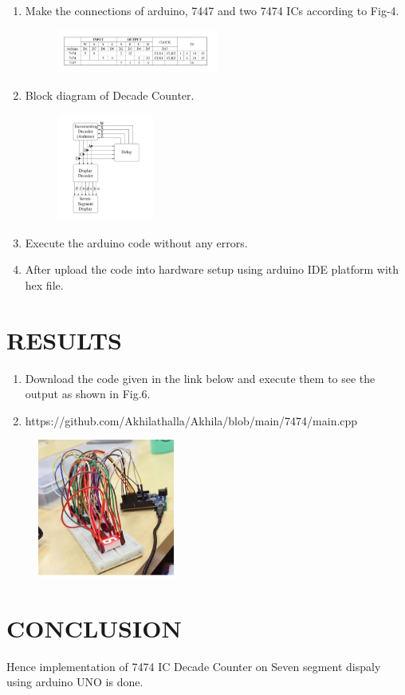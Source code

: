 \documentclass[conference]{IEEEtran}
\begin{document}
\begin{enumerate}

\item Make the connections of arduino, 7447 and two 7474 ICs according to Fig-4.
 \begin{figure}[h] 
 \centering 
 \includegraphics[width=0.5\textwidth]{5.jpg}
 \caption{\label{fig-4:Gates}}    
\end{figure}

\item Block diagram of Decade Counter.

\begin{figure}[h]                           
\centering                                 
\includegraphics[width=0.3\textwidth]{6.jpg}                                           
\caption{\label{fig-5:Gates}}               
\end{figure}


 
\item Execute the arduino code without any errors.
\item After upload the code into hardware setup using arduino IDE platform with hex file.
 \end{enumerate}

\section{RESULTS}
 \begin{enumerate}
  \item Download the code given in the link below and execute them to see the output as shown in Fig.6. 
  \item https://github.com/Akhilathalla/Akhila/blob/main/7474/main.cpp
 \end{enumerate}
   \begin{figure}[h] 
 \centering 
 \includegraphics[width=0.4\textwidth]{7.jpg    }
 \caption{\label{fig-6:Gates}}    
\end{figure}
\section{CONCLUSION}
Hence implementation of 7474 IC Decade Counter on Seven segment dispaly using arduino UNO is done.
\end{document}

